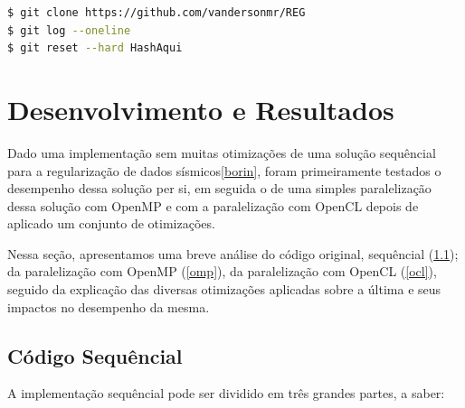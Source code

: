 \documentclass[12pt]{article}
\begin{document}
\begin{lstlisting}[language=bash, caption=Comando para navegar pelas transformações apresentadas no artigo., label=comandogit]
$ git clone https://github.com/vandersonmr/REG
$ git log --oneline
$ git reset --hard HashAqui
\end{lstlisting}

\section{Desenvolvimento e Resultados} \label{desenvolvimento}

Dado uma implementação sem muitas otimizações de uma solução sequêncial para a regularização de dados sísmicos\ref{borin}, foram primeiramente testados o desempenho dessa solução per si, em seguida o de uma simples paralelização dessa solução com OpenMP e com a paralelização com OpenCL depois de aplicado um conjunto de otimizações.

Nessa seção, apresentamos uma breve análise do código original, sequêncial (\ref{seq}); da paralelização com OpenMP (\ref{omp}), da paralelização com OpenCL (\ref{ocl}), seguido da explicação das diversas otimizações aplicadas sobre a última e seus impactos no desempenho da mesma.

\subsection{Código Sequêncial} \label{seq}

A implementação sequêncial pode ser dividido em três grandes partes, a saber: 
\end{document}
